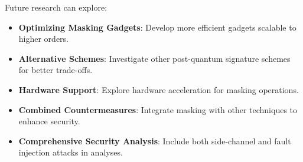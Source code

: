 Future research can explore:

\begin{itemize}
    \item \textbf{Optimizing Masking Gadgets}: Develop more efficient gadgets scalable to higher orders.
    \item \textbf{Alternative Schemes}: Investigate other post-quantum signature schemes for better trade-offs.
    \item \textbf{Hardware Support}: Explore hardware acceleration for masking operations.
    \item \textbf{Combined Countermeasures}: Integrate masking with other techniques to enhance security.
    \item \textbf{Comprehensive Security Analysis}: Include both side-channel and fault injection attacks in analyses.
\end{itemize}
